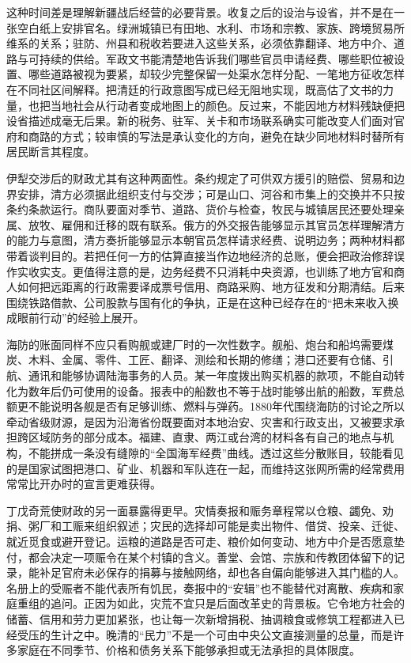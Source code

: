 这种时间差是理解新疆战后经营的必要背景。收复之后的设治与设省，并不是在一张空白纸上安排官名。绿洲城镇已有田地、水利、市场和宗教、家族、跨境贸易所维系的关系；驻防、州县和税收若要进入这些关系，必须依靠翻译、地方中介、道路与可持续的供给。军政文书能清楚地告诉我们哪些官员申请经费、哪些职位被设置、哪些道路被视为要紧，却较少完整保留一处渠水怎样分配、一笔地方征收怎样在不同社区间解释。把清廷的行政意图写成已经无阻地实现，既高估了文书的力量，也把当地社会从行动者变成地图上的颜色。反过来，不能因地方材料残缺便把设省描述成毫无后果。新的税务、驻军、关卡和市场联系确实可能改变人们面对官府和商路的方式；较审慎的写法是承认变化的方向，避免在缺少同地材料时替所有居民断言其程度。

伊犁交涉后的财政尤其有这种两面性。条约规定了可供双方援引的赔偿、贸易和边界安排，清方必须据此组织支付与交涉；可是山口、河谷和市集上的交换并不只按条约条款运行。商队要面对季节、道路、货价与检查，牧民与城镇居民还要处理亲属、放牧、雇佣和迁移的既有联系。俄方的外交报告能够显示其官员怎样理解清方的能力与意图，清方奏折能够显示本朝官员怎样请求经费、说明边务；两种材料都带着谈判目的。若把任何一方的估算直接当作边地经济的总账，便会把政治修辞误作实收实支。更值得注意的是，边务经费不只消耗中央资源，也训练了地方官和商人如何把远距离的行政需要译成票号信用、商路采购、地方征发和分期清结。后来围绕铁路借款、公司股款与国有化的争执，正是在这种已经存在的“把未来收入换成眼前行动”的经验上展开。

海防的账面同样不应只看购舰或建厂时的一次性数字。舰船、炮台和船坞需要煤炭、木料、金属、零件、工匠、翻译、测绘和长期的修缮；港口还要有仓储、引航、通讯和能够协调陆海事务的人员。某一年度拨出购买机器的款项，不能自动转化为数年后仍可使用的设备。报表中的船数也不等于战时能够出航的船数，军费总额更不能说明各舰是否有足够训练、燃料与弹药。1880年代围绕海防的讨论之所以牵动省级财源，是因为沿海省份既要面对本地治安、灾害和行政支出，又被要求承担跨区域防务的部分成本。福建、直隶、两江或台湾的材料各有自己的地点与机构，不能拼成一条没有缝隙的“全国海军经费”曲线。透过这些分散账目，较能看见的是国家试图把港口、矿业、机器和军队连在一起，而维持这张网所需的经常费用常常比开办时的宣言更难获得。

丁戊奇荒使财政的另一面暴露得更早。灾情奏报和赈务章程常以仓粮、蠲免、劝捐、粥厂和工赈来组织叙述；灾民的选择却可能是卖出物件、借贷、投亲、迁徙、就近觅食或避开登记。运粮的道路是否可走、粮价如何变动、地方中介是否愿意垫付，都会决定一项赈令在某个村镇的含义。善堂、会馆、宗族和传教团体留下的记录，能补足官府未必保存的捐募与接触网络，却也各自偏向能够进入其门槛的人。名册上的受赈者不能代表所有饥民，奏报中的“安辑”也不能替代对离散、疾病和家庭重组的追问。正因为如此，灾荒不宜只是后面改革史的背景板。它令地方社会的储蓄、信用和劳力更加紧张，也让每一次新增捐税、抽调粮食或修筑工程都进入已经受压的生计之中。晚清的“民力”不是一个可由中央公文直接测量的总量，而是许多家庭在不同季节、价格和债务关系下能够承担或无法承担的具体限度。

